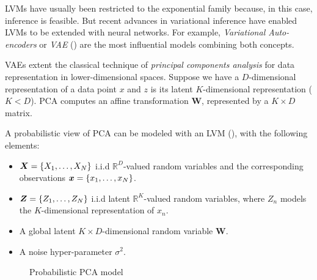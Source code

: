 
LVMs have usually been restricted to the exponential family because, in this case, inference is feasible. But recent advances in variational inference have enabled LVMs to be extended with neural networks. For example, \emph{Variational Auto-encoders} or \emph{VAE} (\cite{kingma2013auto}) are the most influential models combining both concepts.

VAEs extent the classical technique of \emph{principal components analysis} for data representation in lower-dimensional spaces. Suppose we have a \(D\)-dimensional representation of a data point \(x\) and \(z\) is its latent \(K\)-dimensional representation (\(K < D\)). PCA computes an affine transformation \(\bm{W}\), represented by a \(K \times D\) matrix.


A probabilistic view of PCA can be modeled with an LVM (\cite{tipping1999probabilistic}), with the following elements:

\begin{itemize}
  \item \(\bm{X} = \{X_{1},\dots,X_{N}\}\) i.i.d \(\mathbb{R}^{D}\)-valued random variables and the corresponding observations \(\bm{x} = \{x_{1},\dots, x_{N}\}\).
  \item \(\bm{Z} = \{Z_{1}, \dots, Z_{N}\}\) i.i.d latent \(\mathbb{R}^{K}\)-valued random variables, where \(Z_{n}\) models the \(K\)-dimensional representation of \(x_{n}\).
  \item A global latent \(K\times D\)-dimensional random variable \(\bm{W}\).
  \item A noise hyper-parameter \(\sigma^{2}\).
\end{itemize}

\begin{figure}[h!]
  \centering
  \caption{Probabilistic PCA model}\label{fig:ppca}
\end{figure}



